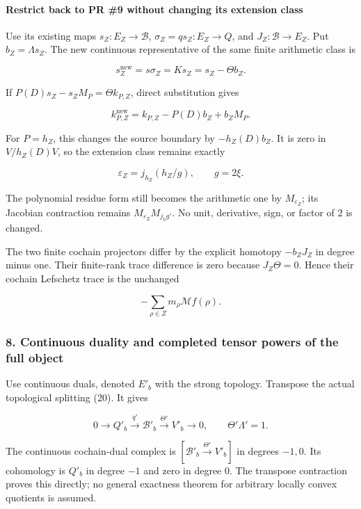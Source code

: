 \paragraph{Restrict back to PR \#9 without changing its extension
class}\label{pr_10:restrict-back-to-pr-9-without-changing-its-extension-class}

Use its existing maps \(s_Z:E_Z\to\mathscr B\), \(\sigma_Z=q s_Z:E_Z\to Q\), and
\(J_Z:\mathscr B\to E_Z\). Put \(b_Z=\Lambda s_Z\). The new continuous representative of the same
finite arithmetic class is

\[s_Z^{\mathrm{new}}=s\sigma_Z=K s_Z=s_Z-\Theta b_Z.\tag{33}\]

If \(P(D)s_Z-s_ZM_P=\Theta k_{P,Z}\), direct substitution gives

\[k_{P,Z}^{\mathrm{new}}=k_{P,Z}-P(D)b_Z+b_ZM_P.\tag{34}\]

For \(P=h_Z\), this changes the source boundary by \(-h_Z(D)b_Z\). It is zero in \(V/h_Z(D)V\), so
the extension class remains exactly

\[\varepsilon_Z=j_{h_Z}(h_Z/g),\qquad g=2\xi.\tag{35}\]

The polynomial residue form still becomes the arithmetic one by \(M_{\varepsilon_Z}\); its Jacobian
contraction remains \(M_{\varepsilon_Z}M_{j_h g'}\). No unit, derivative, sign, or factor of \(2\)
is changed.

The two finite cochain projectors differ by the explicit homotopy \(-b_ZJ_Z\) in degree minus one.
Their finite-rank trace difference is zero because \(J_Z\Theta=0\). Hence their cochain Lefschetz
trace is the unchanged

\[-\sum_{\rho\in Z}m_\rho\mathcal Mf(\rho).\tag{36}\]

\subsubsection{8. Continuous duality and completed tensor powers of the full
object}\label{pr_10:continuous-duality-and-completed-tensor-powers-of-the-full-object}

Use continuous duals, denoted \(E'_b\) with the strong topology. Transpose the actual topological
splitting (20). It gives

\[\boxed{0\to Q'_b\xrightarrow{q'}\mathscr B'_b
\xrightarrow{\Theta'}V'_b\to0,\qquad \Theta'\Lambda'=1.}\tag{37}\]

The continuous cochain-dual complex is \([\mathscr B'_b\xrightarrow{\Theta'}V'_b]\) in degrees
\(-1,0\). Its cohomology is \(Q'_b\) in degree \(-1\) and zero in degree \(0\). The transpose
contraction proves this directly; no general exactness theorem for arbitrary locally convex
quotients is assumed.

